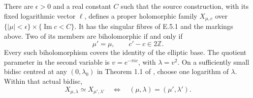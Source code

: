 \begin{theorem}
There are $\epsilon>0$ and a real constant $C$ such that the
source construction, with its fixed logarithmic vector $\ell$,
defines a proper holomorphic family
$X_{\mu,c}$ over
$\{ |\mu|<\epsilon\}\times\{\operatorname{Im}c<C\}$.
It has the singular fibres of E.5.1 and the markings above.
Two of its members are biholomorphic if and only if
\[
 \mu'=\mu,\qquad c'-c\in2\mathbb Z.
\]
Every such biholomorphism covers the identity of the elliptic
base.  The quotient parameter in the second variable is
$v=e^{-\pi i c}$, with $\lambda=v^2$.
On a sufficiently small bidisc centred at any
$(0,\lambda_0)$ in Theorem 1.1 of \cite{ViaTwo26push}, choose
one logarithm of $\lambda$.  Within that actual bidisc,
\[
 X_{\mu,\lambda}\simeq X_{\mu',\lambda'}
 \quad\Longleftrightarrow\quad
 (\mu,\lambda)=(\mu',\lambda').
\]
\end{theorem}
